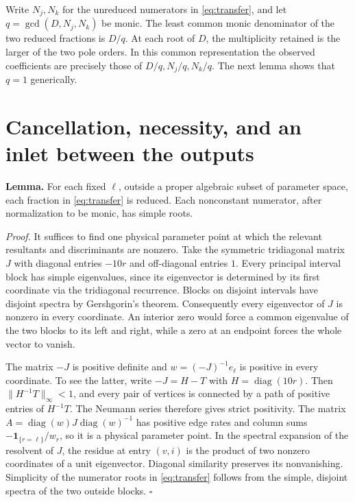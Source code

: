 \documentclass[11pt,a4paper]{article}
\newcommand{\ind}{\mathbf{1}}
\newcommand{\sect}[1]{\section{#1}}
\begin{document}
Write \(N_j,N_k\) for the unreduced numerators in \eqref{eq:transfer}, and let \(q=\gcd(D,N_j,N_k)\) be monic. The least common monic denominator of the two reduced fractions is \(D/q\). At each root of \(D\), the multiplicity retained is the larger of the two pole orders. In this common representation the observed coefficients are precisely those of \(D/q,N_j/q,N_k/q\). The next lemma shows that \(q=1\) generically.


\sect{Cancellation, necessity, and an inlet between the outputs}
\noindent\textbf{Lemma.} For each fixed \(\ell\), outside a proper algebraic subset of parameter space, each fraction in \eqref{eq:transfer} is reduced. Each nonconstant numerator, after normalization to be monic, has simple roots.

\noindent\emph{Proof.}
It suffices to find one physical parameter point at which the relevant resultants and discriminants are nonzero. Take the symmetric tridiagonal matrix \(J\) with diagonal entries \(-10r\) and off-diagonal entries \(1\). Every principal interval block has simple eigenvalues, since its eigenvector is determined by its first coordinate via the tridiagonal recurrence. Blocks on disjoint intervals have disjoint spectra by Gershgorin's theorem. Consequently every eigenvector of \(J\) is nonzero in every coordinate. An interior zero would force a common eigenvalue of the two blocks to its left and right, while a zero at an endpoint forces the whole vector to vanish.

The matrix \(-J\) is positive definite and \(w=(-J)^{-1}e_\ell\) is positive in every coordinate. To see the latter, write \(-J=H-T\) with \(H=\operatorname{diag}(10r)\). Then \(\|H^{-1}T\|_\infty<1\), and every pair of vertices is connected by a path of positive entries of \(H^{-1}T\). The Neumann series therefore gives strict positivity. The matrix \(A=\operatorname{diag}(w)J\operatorname{diag}(w)^{-1}\) has positive edge rates and column sums \(-\ind_{\{r=\ell\}}/w_r\), so it is a physical parameter point. In the spectral expansion of the resolvent of \(J\), the residue at entry \((v,i)\) is the product of two nonzero coordinates of a unit eigenvector. Diagonal similarity preserves its nonvanishing. Simplicity of the numerator roots in \eqref{eq:transfer} follows from the simple, disjoint spectra of the two outside blocks. \(\square\)
\end{document}
